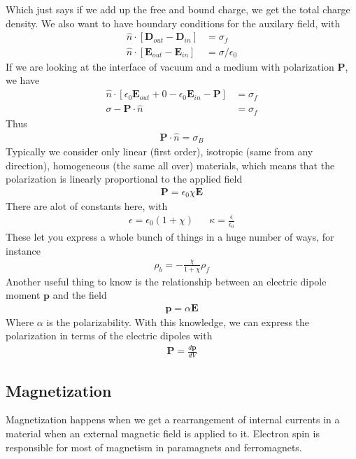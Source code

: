 Which just says if we add up the free and bound charge, we get the total charge density. We also want to have boundary conditions for the auxilary field, with
\begin{align}
\hat{n}\cdot[\textbf{D}_{out}-\textbf{D}_{in}] &= \sigma_f\\
\hat{n}\cdot[\textbf{E}_{out}-\textbf{E}_{in}] &= \sigma/\epsilon_0
\end{align}
If we are looking at the interface of vacuum and a medium with polarization $\textbf{P}$, we have
\begin{align}
\hat{n}\cdot[\epsilon_0\textbf{E}_{out} + 0 -\epsilon_0\textbf{E}_{in} -\textbf{P}] &= \sigma_f\\
\sigma -\textbf{P}\cdot\hat{n} &= \sigma_f
\end{align}
Thus
\begin{align}
\textbf{P}\cdot\hat{n} = \sigma_B
\end{align}
Typically we consider only linear (first order), isotropic (same from any direction), homogeneous (the same all over) materials, which means that the polarization is linearly proportional to the applied field
\begin{align}
\textbf{P} = \epsilon_0\chi\textbf{E}
\end{align}
There are  alot of constants here, with
\begin{align}
\epsilon = \epsilon_0(1+\chi) &&\kappa = \frac{\epsilon}{\epsilon_0}
\end{align}
These let you express a whole bunch of things in a huge number of ways, for instance
\begin{align}
\rho_b = -\frac{\chi}{1+\chi}\rho_f
\end{align}
Another useful thing to know is the relationship between an electric dipole moment $\textbf{p}$ and the field
\begin{align}
    \textbf{p} = \alpha \textbf{E}
\end{align}
Where $\alpha$ is the polarizability. With this knowledge, we can express the polarization in terms of the electric dipoles with
\begin{align}
    \textbf{P} = \frac{d\textbf{p}}{dV}
\end{align}



\subsection{Magnetization}
Magnetization happens when we get a rearrangement of internal currents in a material when an external magnetic field is applied to it. Electron spin is responsible for most of magnetism in paramagnets and ferromagnets.


